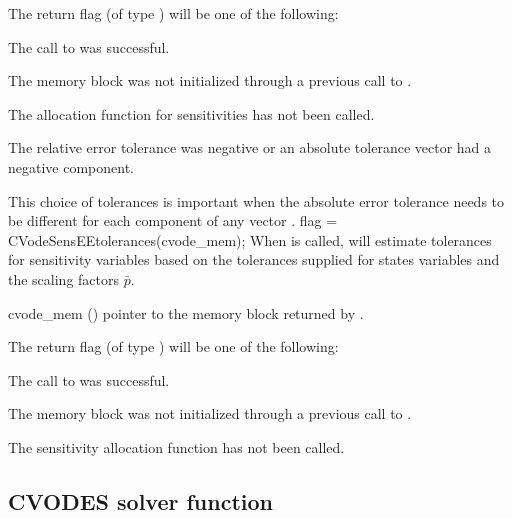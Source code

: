 {
  The return flag  (of type ) will be one of the following:
  \begin{args}
  \item[\Id{CV\_SUCCESS}]
    The call to  was successful.
  \item[\Id{CV\_MEM\_NULL}] 
    The {\cvodes} memory block was not initialized through a previous call to
    .
  \item[\Id{CV\_NO\_SENS}] 
    The allocation function for sensitivities has not been called.
  \item[\Id{CV\_ILL\_INPUT}] 
    The relative error tolerance was negative or an absolute tolerance vector
    had a negative component.
  \end{args}
}
{
  This choice of tolerances is important when the absolute error tolerance needs to
  be different for each component of any vector . 
}
{
  flag = CVodeSensEEtolerances(cvode\_mem);
}
{
  When  is called, {\cvodes} will estimate tolerances for
  sensitivity variables based on the tolerances supplied for states variables
  and the scaling factors $\bar p$.
}
{
  \begin{args}
  \item[cvode\_mem] ()
    pointer to the {\cvodes} memory block returned by .
  \end{args}
}
{
  The return flag  (of type ) will be one of the following:
  \begin{args}
  \item[\Id{CV\_SUCCESS}]
    The call to  was successful.
  \item[\Id{CV\_MEM\_NULL}] 
    The {\cvodes} memory block was not initialized through a previous call to
    .
  \item[\Id{CV\_NO\_SENS}] 
    The sensitivity allocation function has not been called.
  \end{args}
}
{}
\subsection{CVODES solver function}


